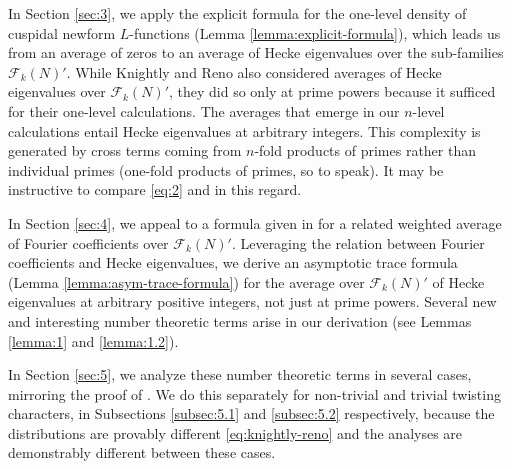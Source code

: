 \documentclass[12pt, reqno,oneside]{amsart}
\theoremstyle{plain}
\theoremstyle{definition}
\theoremstyle{remark}
\theoremstyle{plain}
\numberwithin{equation}{section}
\begin{document}
In Section \ref{sec:3}, we apply the explicit formula for the one-level density of cuspidal newform $L$-functions (Lemma \ref{lemma:explicit-formula}), which leads us from an average of zeros to an average of Hecke eigenvalues over the sub-families $\mathcal{F}_k(N)'$. While Knightly and Reno \cite[Proposition 3.1]{KR18} also considered averages of Hecke eigenvalues over $\mathcal{F}_k(N)'$, they did so only at prime powers because it sufficed for their one-level calculations. The averages that emerge in our $n$-level calculations entail Hecke eigenvalues at arbitrary integers. This complexity is generated by cross terms coming from $n$-fold products of primes rather than individual primes (one-fold products of primes, so to speak). It may be instructive to compare \eqref{eq:2} and \cite[(4.1)]{KR18} in this regard.

In Section \ref{sec:4}, we appeal to a formula given in \cite[Theorem 1.1]{JK15} for a related weighted average of Fourier coefficients over $\mathcal{F}_k(N)'$. Leveraging the relation between Fourier coefficients and Hecke eigenvalues, we derive an asymptotic trace formula (Lemma \ref{lemma:asym-trace-formula}) for the average over $\mathcal{F}_k(N)'$ of Hecke eigenvalues at arbitrary positive integers, not just at prime powers. Several new and interesting number theoretic terms arise in our derivation (see Lemmas \ref{lemma:1} and \ref{lemma:1.2}).

In Section \ref{sec:5}, we analyze these number theoretic terms in several cases, mirroring the proof of \cite[Lemma 3.1]{HM07}. We do this separately for non-trivial and trivial twisting characters, in Subsections \ref{subsec:5.1} and \ref{subsec:5.2} respectively, because the distributions are provably different \eqref{eq:knightly-reno} and the analyses are demonstrably different between these cases. 
\end{document}
